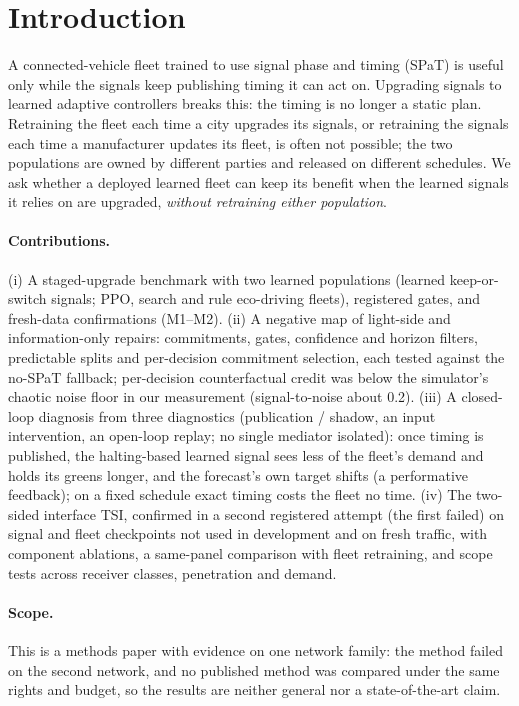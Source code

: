 \documentclass[11pt]{article}
\begin{document}
\section{Introduction}
A connected-vehicle fleet trained to use signal phase and timing (SPaT) is useful only while the signals keep publishing timing it can act
on. Upgrading signals to learned adaptive controllers breaks this: the timing is no longer a static plan. Retraining the fleet each time a
city upgrades its signals, or retraining the signals each time a manufacturer updates its fleet, is often not possible; the two populations
are owned by different parties and released on different schedules. We ask whether a deployed learned fleet can keep its benefit when the
learned signals it relies on are upgraded, \emph{without retraining either population}.
\paragraph{Contributions.}
(i) A staged-upgrade benchmark with two learned populations (learned keep-or-switch signals; PPO, search and rule eco-driving fleets),
registered gates, and fresh-data confirmations (M1--M2).
(ii) A negative map of light-side and information-only repairs: commitments, gates, confidence and horizon filters, predictable splits and
per-decision commitment selection, each tested against the no-SPaT fallback; per-decision counterfactual credit was below the
simulator's chaotic noise floor in our measurement (signal-to-noise about 0.2).
(iii) A closed-loop diagnosis from three diagnostics (publication / shadow, an input intervention, an open-loop replay; no single mediator
isolated): once timing is published, the halting-based learned signal sees less of the fleet's demand and holds its greens longer, and the
forecast's own target shifts (a performative feedback); on a fixed schedule exact timing costs the fleet no time.
(iv) The two-sided interface TSI, confirmed in a second registered attempt (the first failed) on signal and fleet checkpoints not used in
development and on fresh traffic, with component ablations, a same-panel comparison
with fleet retraining, and scope tests across receiver classes, penetration and demand.
\paragraph{Scope.} This is a methods paper with evidence on one network family: the method failed on the second network, and no
published method was compared under the same rights and budget, so the results are neither general nor a state-of-the-art claim.
\end{document}
